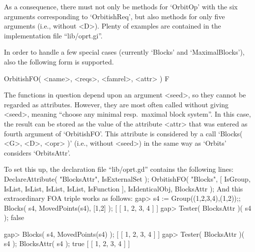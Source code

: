 As a  consequence, there must not only be methods for `OrbitOp' with
the six arguments corresponding to `OrbitishReq',
but also methods for only five arguments (i.e., without <D>).
Plenty of examples are contained in the implementation file ``lib/oprt.gi''.

In order to handle a few special cases
(currently `Blocks' and `MaximalBlocks'),
also the following form is supported.

\)OrbitishFO( <name>, <reqs>, <famrel>, <attr> ) F

The functions in question depend upon an argument <seed>,
so they cannot be regarded as attributes.
However, they are most often called without giving <seed>,
meaning ``choose any minimal resp.\ maximal block system''.
In this case, the result can be stored as the value of the attribute
<attr> that was entered as fourth argument of `OrbitishFO'.
This attribute is considered by a call `Blocks( <G>, <D>, <opr> )'
(i.e., without <seed>) in the same way as `Orbits' considers  `OrbitsAttr'.

To set this up, the declaration file ``lib/oprt.gd'' contains the following
lines:
\begintt
DeclareAttribute( "BlocksAttr", IsExternalSet );
OrbitishFO( "Blocks",
    [ IsGroup, IsList, IsList,
      IsList,
      IsList,
      IsFunction ], IsIdenticalObj, BlocksAttr );
\endtt
And this extraordinary FOA triple works as follows:
\beginexample
gap> s4 := Group((1,2,3,4),(1,2));; Blocks( s4, MovedPoints(s4), [1,2] );
[ [ 1, 2, 3, 4 ] ]
gap> Tester( BlocksAttr )( s4 );
false
\endexample

\beginexample
gap> Blocks( s4, MovedPoints(s4) );       
[ [ 1, 2, 3, 4 ] ]
gap> Tester( BlocksAttr )( s4 );  BlocksAttr( s4 );
true
[ [ 1, 2, 3, 4 ] ]
\endexample



